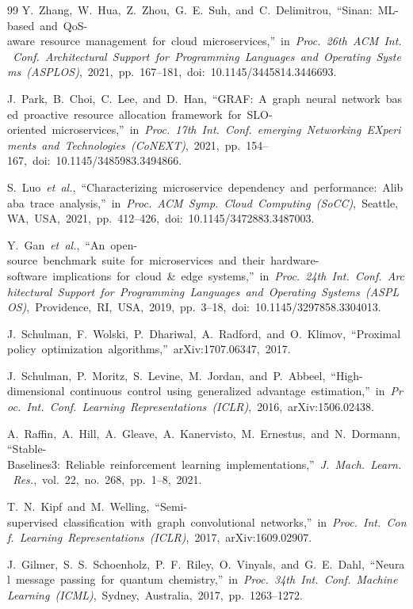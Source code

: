 \documentclass[12pt,a4paper,oneside]{report}
\begin{document}
\begin{thebibliography}{99}
Y.~Zhang,~W.~Hua,~Z.~Zhou,~G.~E.~Suh,~and~C.~Delimitrou,~``Sinan:~ML-based~and~QoS-aware~resource~management~for~cloud~microservices,''~in~\textit{Proc.~26th~ACM~Int.~Conf.~Architectural~Support~for~Programming~Languages~and~Operating~Systems~(ASPLOS)},~2021,~pp.~167--181,~doi:~10.1145/3445814.3446693.

J.~Park,~B.~Choi,~C.~Lee,~and~D.~Han,~``GRAF:~A~graph~neural~network~based~proactive~resource~allocation~framework~for~SLO-oriented~microservices,''~in~\textit{Proc.~17th~Int.~Conf.~emerging~Networking~EXperiments~and~Technologies~(CoNEXT)},~2021,~pp.~154--167,~doi:~10.1145/3485983.3494866.

S.~Luo~\textit{et~al.},~``Characterizing~microservice~dependency~and~performance:~Alibaba~trace~analysis,''~in~\textit{Proc.~ACM~Symp.~Cloud~Computing~(SoCC)},~Seattle,~WA,~USA,~2021,~pp.~412--426,~doi:~10.1145/3472883.3487003.

Y.~Gan~\textit{et~al.},~``An~open-source~benchmark~suite~for~microservices~and~their~hardware-software~implications~for~cloud~\&~edge~systems,''~in~\textit{Proc.~24th~Int.~Conf.~Architectural~Support~for~Programming~Languages~and~Operating~Systems~(ASPLOS)},~Providence,~RI,~USA,~2019,~pp.~3--18,~doi:~10.1145/3297858.3304013.

J.~Schulman,~F.~Wolski,~P.~Dhariwal,~A.~Radford,~and~O.~Klimov,~``Proximal~policy~optimization~algorithms,''~arXiv:1707.06347,~2017.

J.~Schulman,~P.~Moritz,~S.~Levine,~M.~Jordan,~and~P.~Abbeel,~``High-dimensional~continuous~control~using~generalized~advantage~estimation,''~in~\textit{Proc.~Int.~Conf.~Learning~Representations~(ICLR)},~2016,~arXiv:1506.02438.

A.~Raffin,~A.~Hill,~A.~Gleave,~A.~Kanervisto,~M.~Ernestus,~and~N.~Dormann,~``Stable-Baselines3:~Reliable~reinforcement~learning~implementations,''~\textit{J.~Mach.~Learn.~Res.},~vol.~22,~no.~268,~pp.~1--8,~2021.

T.~N.~Kipf~and~M.~Welling,~``Semi-supervised~classification~with~graph~convolutional~networks,''~in~\textit{Proc.~Int.~Conf.~Learning~Representations~(ICLR)},~2017,~arXiv:1609.02907.

J.~Gilmer,~S.~S.~Schoenholz,~P.~F.~Riley,~O.~Vinyals,~and~G.~E.~Dahl,~``Neural~message~passing~for~quantum~chemistry,''~in~\textit{Proc.~34th~Int.~Conf.~Machine~Learning~(ICML)},~Sydney,~Australia,~2017,~pp.~1263--1272.


\end{thebibliography}
\end{document}
